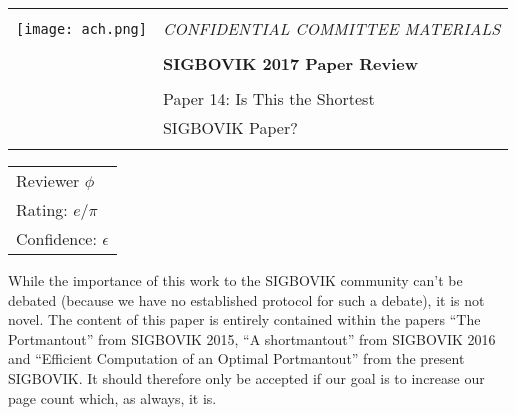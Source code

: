\documentclass[12pt]{article}
\begin{document}
{\sffamily
\begin{tabular}{ll}
\multirow{3}{*}{\texttt{[image: ach.png]}}\\
& \Large{\em CONFIDENTIAL COMMITTEE MATERIALS} \\
&\\
& \textbf{\Huge{SIGBOVIK 2017 Paper Review}} \\
&\\
& \LARGE{Paper 14: Is This the Shortest} \\
& \LARGE{SIGBOVIK Paper?}\\
&\\
\hline
\end{tabular}}
\vspace{2em}
\thispagestyle{empty}

{\large\bf
\begin{tabular}{l}
Reviewer $\phi$\\
Rating: $e$/$\pi$\\
Confidence: $\epsilon$\\
\end{tabular}}
\vspace{1em}

While the importance of this work to the SIGBOVIK community can't be debated
(because we have no established protocol for such a debate), it is not novel.
The content of this paper is entirely contained within the papers
``The Portmantout'' from SIGBOVIK 2015,
``A shortmantout'' from SIGBOVIK 2016 and ``Efficient Computation of an
Optimal Portmantout'' from the present SIGBOVIK. It should therefore only
be accepted if our goal is to increase our page count which, as always, it is.
\end{document}
